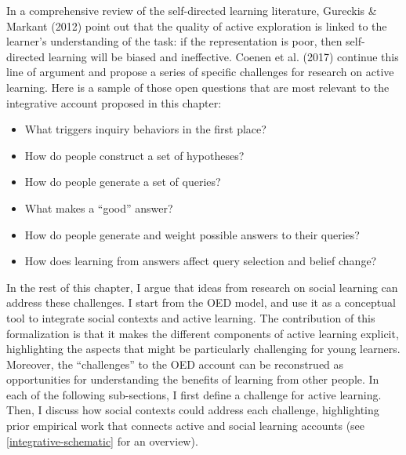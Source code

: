 \documentclass[oneside]{report}
\begin{document}
In a comprehensive review of the self-directed learning literature,
Gureckis \& Markant (2012) point out that the quality of active
exploration is linked to the learner's understanding of the task: if the
representation is poor, then self-directed learning will be biased and
ineffective. Coenen et al. (2017) continue this line of argument and
propose a series of specific challenges for research on active learning.
Here is a sample of those open questions that are most relevant to the
integrative account proposed in this chapter:
\begin{itemize}
\tightlist
\item
  What triggers inquiry behaviors in the first place?
\item
  How do people construct a set of hypotheses?
\item
  How do people generate a set of queries?
\item
  What makes a ``good'' answer?
\item
  How do people generate and weight possible answers to their queries?
\item
  How does learning from answers affect query selection and belief
  change?
\end{itemize}
\noindent
In the rest of this chapter, I argue that ideas from research on social
learning can address these challenges. I start from the OED model, and
use it as a conceptual tool to integrate social contexts and active
learning. The contribution of this formalization is that it makes the
different components of active learning explicit, highlighting the
aspects that might be particularly challenging for young learners.
Moreover, the ``challenges'' to the OED account can be reconstrued as
opportunities for understanding the benefits of learning from other
people. In each of the following sub-sections, I first define a
challenge for active learning. Then, I discuss how social contexts could
address each challenge, highlighting prior empirical work that connects
active and social learning accounts (see \ref{integrative-schematic} for
an overview).

\end{document}
